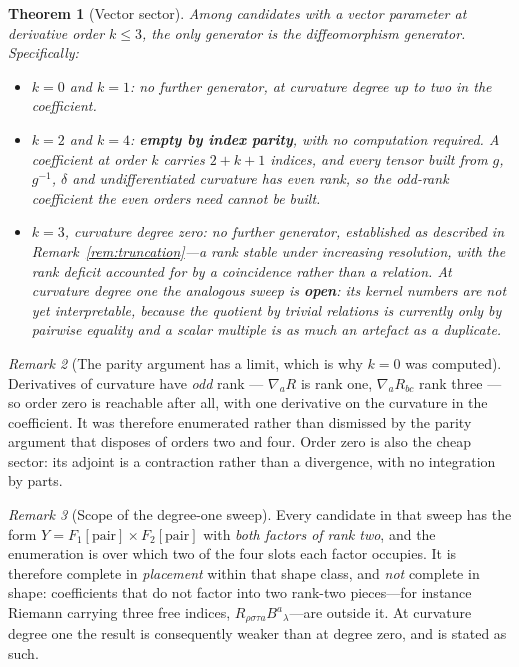 \documentclass[11pt]{article}
\newtheorem{theorem}{Theorem}[section]
\theoremstyle{definition}
\theoremstyle{remark}
\newtheorem{remark}[theorem]{Remark}
\begin{document}
\begin{theorem}[Vector sector]
\label{thm:vector}
Among candidates with a vector parameter at derivative order \(k\le 3\), the
only generator is the diffeomorphism generator.  Specifically:
\begin{itemize}\itemsep2pt
\item \(k=0\) and \(k=1\): no further generator, at curvature degree up to two
  in the coefficient.
\item \(k=2\) and \(k=4\): \textbf{empty by index parity}, with no computation
  required.  A coefficient at order \(k\) carries \(2+k+1\) indices, and every
  tensor built from \(g\), \(g^{-1}\), \(\delta\) and undifferentiated
  curvature has even rank, so the odd-rank coefficient the even orders need
  cannot be built.
\item \(k=3\), curvature degree zero: no further generator, established as
  described in Remark~\ref{rem:truncation}---a rank stable under increasing
  resolution, with the rank deficit accounted for by a coincidence rather than
  a relation.  At curvature degree \emph{one} the analogous sweep is
  \textbf{open}: its kernel numbers are not yet interpretable, because the
  quotient by trivial relations is currently only by pairwise equality and a
  scalar multiple is as much an artefact as a duplicate.
\end{itemize}
\end{theorem}

\begin{remark}[The parity argument has a limit, which is why \(k=0\) was computed]
Derivatives of curvature have \emph{odd} rank --- \(\nabla_{a}R\) is rank one,
\(\nabla_{a}R_{bc}\) rank three --- so order zero is reachable after all, with
one derivative on the curvature in the coefficient.  It was therefore
enumerated rather than dismissed by the parity argument that disposes of orders
two and four.  Order zero is also the cheap sector: its adjoint is a
contraction rather than a divergence, with no integration by parts.
\end{remark}

\begin{remark}[Scope of the degree-one sweep]
\label{rem:shape}
Every candidate in that sweep has the form \(Y=F_{1}[\text{pair}]\times
F_{2}[\text{pair}]\) with \emph{both factors of rank two}, and the enumeration
is over which two of the four slots each factor occupies.  It is therefore
complete in \emph{placement} within that shape class, and \emph{not} complete
in shape: coefficients that do not factor into two rank-two pieces---for
instance Riemann carrying three free indices, \(R_{\rho\sigma\tau
a}B^{a}{}_{\lambda}\)---are outside it.  At curvature degree one the result is
consequently weaker than at degree zero, and is stated as such.
\end{remark}
\end{document}
